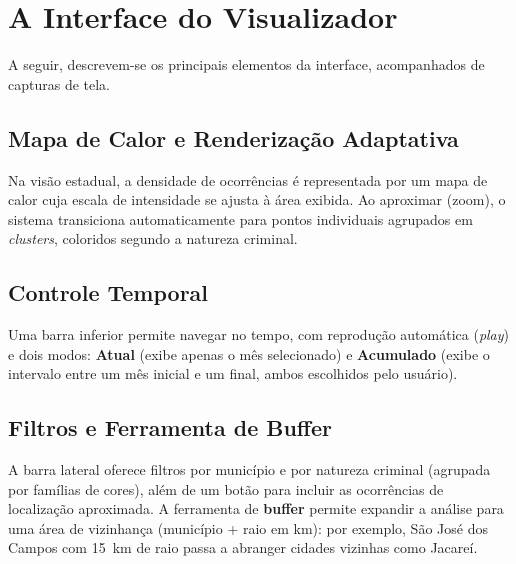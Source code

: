 \documentclass[reprint,amsmath,amssymb,aps,prl,floatfix,onecolumn]{revtex4-2}
\begin{document}
\section{A Interface do Visualizador}
A seguir, descrevem-se os principais elementos da interface, acompanhados de capturas de tela.


\subsection{Mapa de Calor e Renderização Adaptativa}
Na visão estadual, a densidade de ocorrências é representada por um mapa de calor cuja escala de
intensidade se ajusta à área exibida. Ao aproximar (zoom), o sistema transiciona automaticamente
para pontos individuais agrupados em \textit{clusters}, coloridos segundo a natureza criminal.


\subsection{Controle Temporal}
Uma barra inferior permite navegar no tempo, com reprodução automática (\textit{play}) e dois modos:
\textbf{Atual} (exibe apenas o mês selecionado) e \textbf{Acumulado} (exibe o intervalo entre um
mês inicial e um final, ambos escolhidos pelo usuário).


\subsection{Filtros e Ferramenta de Buffer}
A barra lateral oferece filtros por município e por natureza criminal (agrupada por famílias de
cores), além de um botão para incluir as ocorrências de localização aproximada. A ferramenta de
\textbf{buffer} permite expandir a análise para uma área de vizinhança (município + raio em km):
por exemplo, São José dos Campos com 15~km de raio passa a abranger cidades vizinhas como Jacareí.
\end{document}
